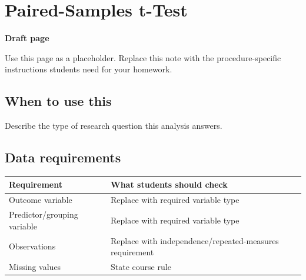 \documentclass[
  letterpaper,
  DIV=11,
  numbers=noendperiod]{scrreprt}
\newcounter{none} %
\begin{document}
\chapter{Paired-Samples t-Test}\label{paired-samples-t-test}

\begin{tcolorbox}[enhanced jigsaw, arc=.35mm, bottomrule=.15mm, breakable, colback=white, colframe=quarto-callout-note-color-frame, left=2mm, leftrule=.75mm, opacityback=0, rightrule=.15mm, toprule=.15mm]
\begin{minipage}[t]{5.5mm}
\textcolor{quarto-callout-note-color}{\faInfo}
\end{minipage}%
\begin{minipage}[t]{\textwidth - 5.5mm}

\vspace{-3mm}\textbf{Draft page}\vspace{3mm}

Use this page as a placeholder. Replace this note with the
procedure-specific instructions students need for your homework.

\end{minipage}%
\end{tcolorbox}

\section{When to use this}\label{when-to-use-this-5}

Describe the type of research question this analysis answers.

\section{Data requirements}\label{data-requirements-6}

{\def\LTcaptype{none} %
\begin{longtable}[]{@{}
  >{\raggedright\arraybackslash}p{}
  >{\raggedright\arraybackslash}p{}@{}}
\toprule\noalign{}
\begin{minipage}[b]{\linewidth}\raggedright
Requirement
\end{minipage} & \begin{minipage}[b]{\linewidth}\raggedright
What students should check
\end{minipage} \\
\midrule\noalign{}
\endhead
\bottomrule\noalign{}
\endlastfoot
Outcome variable & Replace with required variable type \\
Predictor/grouping variable & Replace with required variable type \\
Observations & Replace with independence/repeated-measures
requirement \\
Missing values & State course rule \\
\end{longtable}
}
\end{document}
